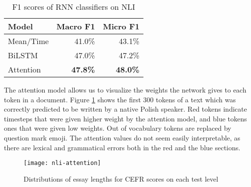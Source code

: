 \begin{table}
  \centering
  \begin{tabular}{|l|rr|}
    \toprule
    Model     & Macro F1        & Micro F1        \\
    \midrule
    Mean/Time &         41.0\%  &         43.1\%  \\
    BiLSTM    &         47.0\%  &         47.2\%  \\
    Attention & \textbf{47.8\%} & \textbf{48.0\%} \\
    \bottomrule
  \end{tabular}
  \caption{F1 scores of RNN classifiers on NLI}
  \label{rnn-nli-results}
\end{table}

The attention model allows us to visualize the weights the network gives to
each token in a document. Figure \ref{fig:nli-attention} shows the first 300
tokens of a text which was correctly predicted to be written by a native Polish
speaker. Red tokens indicate timesteps that were given higher weight by the attention
model, and blue tokens ones that were given low weights. Out of vocabulary tokens
are replaced by question mark emoji. The attention values do not seem easily
interpretable, as there are lexical and grammatical errors both in the red and
the blue sections.

\begin{figure}
  \centering
  \texttt{[image: nli-attention]}
  \caption{Distributions of essay lengths for CEFR scores on each test level}
  \label{fig:nli-attention}
\end{figure}
